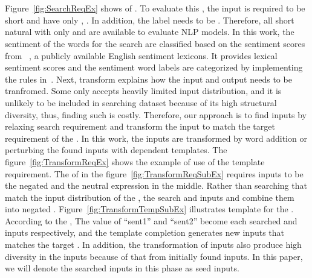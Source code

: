 
\begin{figure}[t]
  \centering
  
  \vspace{-10pt}
  \caption{\SearchRequirementExampleFigCaption}
  \vspace{-10pt}
\end{figure}

\begin{figure}[t]
  \centering
  \subfloat[][\TransformRequirementExampleSubFigCaption]{}
  \\
  \subfloat[][\TransformTemplateExampleSubFigCaption]{}
  \\
  \caption{\TransformRequirementExampleFigCaption}
  \vspace{-10pt}
\end{figure}

Figure~\ref{fig:SearchReqEx} shows \lc of \SareqExOne. To evaluate
this \lc, the input is required to be short and have only \neu \adjs,
\neu \nns. In addition, the label needs to be \neu. Therefore, all
short natural \sents with only \neu \adjs and \neu \nns are available
to evaluate NLP models. In this work, the sentiment of the words for
the search are classified based on the sentiment scores from
\Swn~\cite{baccianella2010sentiwordnet}, a publicly available English
sentiment lexicons.  It provides lexical sentiment scores and the
sentiment word labels are categorized by implementing the rules
in~\cite{mihaela2017sentiwordnetlabel}. Next, transform \req explains
how the input and output needs to be tranfromed. Some \lc only accepts
heavily limited input distribution, and it is unlikely to be included
in searching dataset because of its high structural diversity, thus,
finding such \sents is costly. Therefore, our approach is to find
inputs by relaxing search requirement and transform the input to match
the target requirement of the \lc. In this work, the inputs are
transformed by word addition or perturbing the found inputs with \lc
dependent templates. The figure~\ref{fig:TransformReqEx} shows the
example of use of the template requirement. The \lc of \SareqExTwo in
the figure~\ref{fig:TransformReqSubEx} requires inputs to be the
negated \pstv \sents and the neutral expression in the middle. Rather
than searching \sents that match the input distribution of the \lc,
the \Model search \pstv and \neu inputs and combine them into negated
\pstv \sents. Figure~\ref{fig:TransformTempSubEx} illustrates template
for the \lc. According to the \lc, The value of ``sent1'' and
``sent2'' become each searched \neu and \pstv inputs respectively, and
the template completion generates new inputs that matches the target
\lc. In addition, the transformation of inputs also produce high
diversity in the inputs because of that from initially found
inputs. In this paper, we will denote the searched inputs in this
phase as seed inputs.

